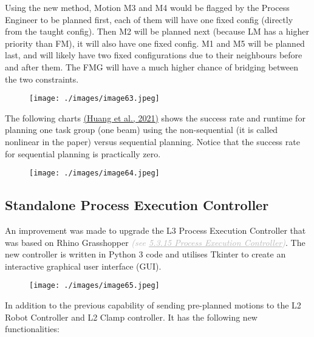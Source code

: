Using the new method, Motion M3 and M4 would be flagged by the Process Engineer to be planned first, each of them will have one fixed config (directly from the taught config). Then M2 will be planned next (because LM has a higher priority than FM), it will also have one fixed config. M1 and M5 will be planned last, and will likely have two fixed configurations due to their neighbours before and after them. The FMG will have a much higher chance of bridging between the two constraints. 

\begin{figure}[H]
\texttt{[image: ./images/image63.jpeg]}
\end{figure}


The following charts \href{https://www.zotero.org/google-docs/?LIhaZP}{(Huang et al., 2021)} shows the success rate and runtime for planning one task group (one beam) using the non-sequential (it is called nonlinear in the paper) versus sequential planning. Notice that the success rate for sequential planning is practically zero. 

\begin{figure}[H]
\texttt{[image: ./images/image64.jpeg]}
\end{figure}


\vspace{1\baselineskip}
\subsection{Standalone Process Execution Controller}

An improvement was made to upgrade the L3 Process Execution Controller that was based on Rhino Grasshopper \textit{\textcolor[HTML]{B7B7B7}{(see \uline{5.3.15 Process Execution Controller})}}. The new controller is written in Python 3 code and utilises Tkinter to create an interactive graphical user interface (GUI).

\begin{figure}[H]
\texttt{[image: ./images/image65.jpeg]}
\end{figure}


In addition to the previous capability of sending pre-planned motions to the L2 Robot Controller and L2 Clamp controller. It has the following new functionalities:

